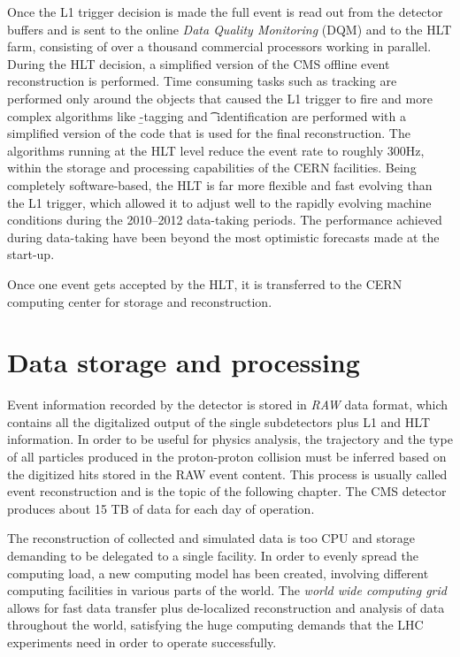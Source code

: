 Once the L1 trigger decision is made the full event is read out from the detector buffers and is sent to the online \emph{Data Quality Monitoring} (DQM) and to the HLT farm, consisting of over a thousand commercial processors working in parallel. During the HLT decision, a simplified version of the CMS offline event reconstruction is performed. Time consuming tasks such as tracking are performed only around the objects that caused the L1 trigger to fire and more complex algorithms like \b-tagging and \t~identification are performed with a simplified version of the code that is used for the final reconstruction. 
The algorithms running at the HLT level %
reduce the event rate to roughly 300Hz, within the storage and processing capabilities of the CERN facilities. Being completely software-based, the HLT is far more flexible and fast evolving than the L1 trigger, which allowed it to adjust well to the rapidly evolving machine conditions during the 2010--2012 data-taking periods. The performance achieved during data-taking have been beyond the most optimistic forecasts made at the start-up.

Once one event gets accepted by the HLT, it is transferred to the CERN computing center for storage and reconstruction.

\section{Data storage and processing}

Event information recorded by the detector is stored in \emph{RAW} data format, which contains all the digitalized output of the single subdetectors plus L1 and HLT information. In order to be useful for physics analysis, the trajectory and the type of all particles produced in the proton-proton collision must be inferred based on the digitized hits stored in the RAW event content. This process is usually called event reconstruction and is the topic of the following chapter. The CMS detector produces about 15 TB of data for each day of operation.

The reconstruction of collected and simulated data is too CPU and storage demanding to be delegated to a single facility. In order to evenly spread the computing load, a new computing model has been created, involving different computing facilities in various parts of the world. The \emph{world wide computing grid} \cite{Malecki:2005gn} allows for fast data transfer plus de-localized reconstruction and analysis of data throughout the world, satisfying the huge computing demands that the LHC experiments need in order to operate successfully. 

